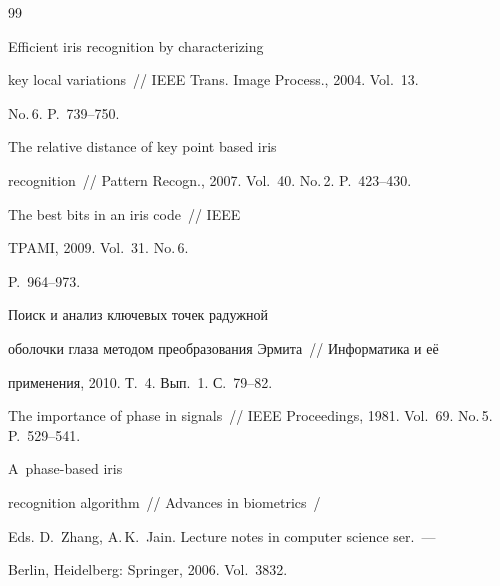 {\small\frenchspacing


{%




\begin{thebibliography}{99}







 Efficient iris recognition by characterizing 


key local variations~/\!\!/ IEEE Trans. Image Process., 2004. Vol.~13. 


No.\,6. P.~739--750. 







 The relative distance of key point based iris 


recognition~/\!\!/ Pattern Recogn., 2007. Vol.~40. No.\,2. P.~423--430.




 The best bits in an iris code~/\!\!/ IEEE 


TPAMI, 2009. Vol.~31. No.\,6. 


P.~964--973.







 Поиск и анализ ключевых точек радужной 


оболочки глаза методом преобразования Эрмита~/\!\!/ Информатика и её 


применения, 2010. Т.~4. Вып.~1. С.~79--82.






The importance of phase in signals~// IEEE Proceedings, 1981. Vol.~69. No.\,5. P.~529--541.




 A~phase-based iris 


recognition algorithm~/\!\!/ Advances in biometrics~/ 


Eds. D.~Zhang, A.\,K.~Jain. Lecture notes in computer science ser.~--- 


Berlin, Heidelberg: Springer, 2006.  Vol.~3832. 



\end{thebibliography}}}
